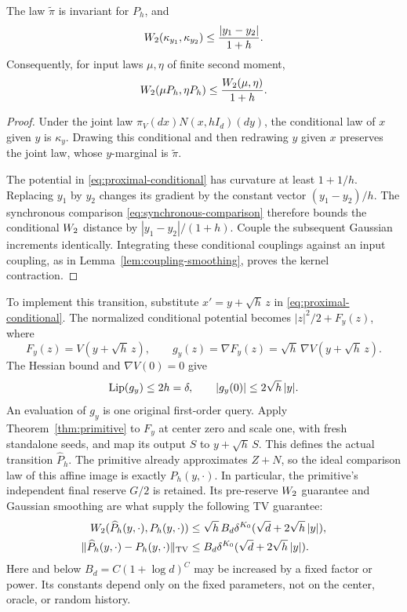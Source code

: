 \begin{lemma}\label{lem:proximal-contraction}
The law $\widetilde\pi$ is invariant for $P_h$, and
\[
 W_2(\kappa_{y_1},\kappa_{y_2})
       \le\frac{|y_1-y_2|}{1+h}.
\]
Consequently, for input laws $\mu,\eta$ of finite second moment,
\[
 W_2(\mu P_h,\eta P_h)
       \le\frac{W_2(\mu,\eta)}{1+h}.
\]
\end{lemma}
\begin{proof}
Under the joint law $\pi_V(dx)N(x,hI_d)(dy)$, the conditional law
of $x$ given $y$ is $\kappa_y$. Drawing this conditional and then
redrawing $y$ given $x$ preserves the joint law, whose $y$-marginal
is $\widetilde\pi$.

The potential in \eqref{eq:proximal-conditional} has curvature at
least $1+1/h$. Replacing $y_1$ by $y_2$ changes its gradient by the
constant vector $(y_1-y_2)/h$. The synchronous comparison
\eqref{eq:synchronous-comparison} therefore bounds the conditional
$W_2$ distance by $|y_1-y_2|/(1+h)$. Couple the subsequent Gaussian
increments identically. Integrating these conditional couplings
against an input coupling, as in Lemma~\ref{lem:coupling-smoothing},
proves the kernel contraction.
\end{proof}

To implement this transition, substitute $x'=y+\sqrt h\,z$ in
\eqref{eq:proximal-conditional}. The normalized conditional potential
becomes $|z|^2/2+F_y(z)$, where
\begin{equation}\label{eq:proximal-primitive}
 F_y(z)=V(y+\sqrt h\,z),\qquad
 g_y(z)=\nabla F_y(z)=\sqrt h\,\nabla V(y+\sqrt h\,z).
\end{equation}
The Hessian bound and $\nabla V(0)=0$ give
\[
 \operatorname{Lip}(g_y)\le2h=\delta,\qquad |g_y(0)|\le2\sqrt h\,|y|.
\]
An evaluation of $g_y$ is one original first-order query. Apply
Theorem~\ref{thm:primitive} to $F_y$ at center zero and scale one,
with fresh standalone seeds, and map its output $S$ to
$y+\sqrt h\,S$. This defines the actual transition $\widehat P_h$.
The primitive already approximates $Z+N$, so the ideal comparison
law of this affine image is exactly $P_h(y,\cdot)$.
In particular, the primitive's independent final reserve $G/2$
is retained. Its pre-reserve $W_2$ guarantee and Gaussian smoothing
are what supply the following TV guarantee:
\begin{equation}\label{eq:proximal-local-errors}
 \begin{aligned}
 W_2(\widehat P_h(y,\cdot),P_h(y,\cdot))
   &\le\sqrt h\,B_d\delta^{K_0}
                    (\sqrt d+2\sqrt h\,|y|),\\
 \lVert\widehat P_h(y,\cdot)-P_h(y,\cdot)\rVert_{\mathrm{TV}}
   &\le B_d\delta^{K_0}(\sqrt d+2\sqrt h\,|y|).
 \end{aligned}
\end{equation}
Here and below $B_d=C(1+\log d)^C$ may be increased by a fixed
factor or power. Its constants depend only on the fixed parameters,
not on the center, oracle, or random history.

